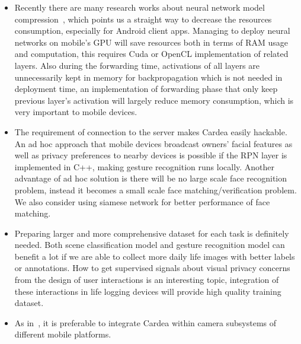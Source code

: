 \begin{itemize}

\item Recently there are many research works about neural network model compression~\cite{han2015deep}, which points us a straight way to decrease the resources consumption, especially for Android client apps. Managing to deploy neural networks on mobile's GPU will save resources both in terms of RAM usage and computation, this requires Cuda or OpenCL implementation of related layers. Also during the forwarding time, activations of all layers are unnecessarily kept in memory for backpropagation which is not needed in deployment time, an implementation of forwarding phase that only keep previous layer's activation will largely reduce memory consumption, which is very important to mobile devices.
\item The requirement of connection to the server makes Cardea easily hackable. An ad hoc approach that mobile devices broadcast owners' facial features as well as privacy preferences to nearby devices is possible if the RPN layer is implemented in C++, making gesture recognition runs locally. Another advantage of ad hoc solution is there will be no large scale face recognition problem, instead it becomes a small scale face matching/verification problem. We also consider using siamese network for better performance of face matching.
\item Preparing larger and more comprehensive dataset for each task is definitely needed. Both scene classification model and gesture recognition model can benefit a lot if we are able to collect more daily life images with better labels or annotations. How to get supervised signals about visual privacy concerns from the design of user interactions is an interesting topic, integration of these interactions in life logging devices will provide high quality training dataset.
\item As in~\cite{raval2016you}, it is preferable to integrate Cardea within camera subsystems of different mobile platforms.

\end{itemize}


\newpage
